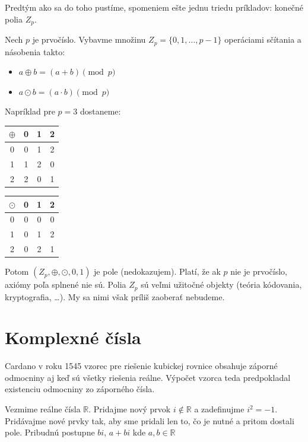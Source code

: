 \documentclass[11pt,a4paper]{article}
\theoremstyle{definition}
\theoremstyle{plain}
\theoremstyle{remark}
\newcommand{\R}{\mathbb{R}}
\begin{document}
Predtým ako sa do toho pustíme, spomeniem ešte jednu triedu príkladov: konečné polia $Z_p$.

Nech $p$ je prvočíslo. Vybavme množinu $Z_p = \{0, 1, \dots, p-1\}$ operáciami sčítania a násobenia takto:
\begin{itemize}
    \item $a \oplus b = (a+b) \pmod p$
    \item $a \odot b = (a \cdot b) \pmod p$
\end{itemize}

Napríklad pre $p=3$ dostaneme:

\begin{center}
\begin{tabular}{c|ccc}
$\oplus$ & 0 & 1 & 2 \\
\hline
0 & 0 & 1 & 2 \\
1 & 1 & 2 & 0 \\
2 & 2 & 0 & 1
\end{tabular}
\hspace{2cm}
\begin{tabular}{c|ccc}
$\odot$ & 0 & 1 & 2 \\
\hline
0 & 0 & 0 & 0 \\
1 & 0 & 1 & 2 \\
2 & 0 & 2 & 1
\end{tabular}
\end{center}

Potom $(Z_p, \oplus, \odot, 0, 1)$ je pole (nedokazujem). Platí, že ak $p$ nie je
prvočíslo, axiómy poľa splnené nie sú.  Polia $Z_p$ sú veľmi užitočné objekty (teória
kódovania, kryptografia, \dots). My sa nimi však príliš zaoberať nebudeme.

\section{Komplexné čísla}

Cardano v roku 1545 vzorec pre riešenie kubickej rovnice obsahuje záporné odmocniny
aj keď sú všetky riešenia reálne. Výpočet vzorca teda predpokladal existenciu
odmocniny zo záporného čísla.

Vezmime reálne čísla $\R$. Pridajme nový prvok $i \notin \R$ a zadefinujme $i^2 =
-1$. Pridávajme nové prvky tak, aby sme pridali len to, čo je nutné a pritom dostali
pole. Pribudnú postupne $bi$, $a+bi$ kde $a, b \in \R$
\end{document}
